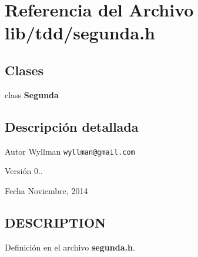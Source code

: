 \section{Referencia del Archivo lib/tdd/segunda.h}
\label{segunda_8h}
\subsection*{Clases}
\begin{DoxyCompactItemize}
\item 
class {\bf Segunda}
\end{DoxyCompactItemize}


\subsection{Descripción detallada}
\begin{DoxyAuthor}{Autor}
Wyllman {\tt wyllman@gmail.\+com} 
\end{DoxyAuthor}
\begin{DoxyVersion}{Versión}
0.. 
\end{DoxyVersion}
\begin{DoxyDate}{Fecha}
Noviembre, 2014 
\end{DoxyDate}
\subsection{D\+E\+S\+C\+R\+I\+P\+T\+I\+O\+N}\label{main_8cpp_DESCRIPTION}


Definición en el archivo {\bf segunda.\+h}.

